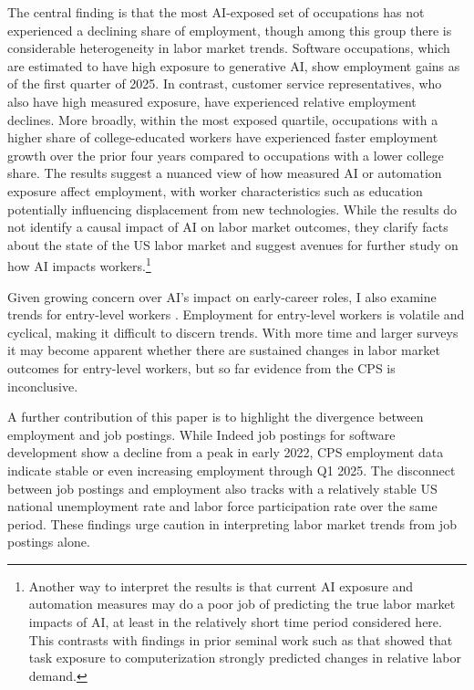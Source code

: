\documentclass[12pt]{article}
\numberwithin{equation}{section}
\theoremstyle{theorem}\newcustomtheorem{theorem}{{\bf\sc Theorem}}
\theoremstyle{definition}\newcustomtheorem{assumption}{{\bf\sc Assumption}}
\theoremstyle{theorem} \newcustomtheorem{proposition}{{\bf\sc Proposition}}
\begin{document}
The central finding is that the most AI-exposed set of occupations has not experienced a declining share of employment, though among this group there is considerable heterogeneity in labor market trends. Software occupations, which are estimated to have high exposure to generative AI, show employment gains as of the first quarter of 2025. In contrast, customer service representatives, who also have high measured exposure, have experienced relative employment declines. More broadly, within the most exposed quartile, occupations with a higher share of college-educated workers have experienced faster employment growth over the prior four years compared to occupations with a lower college share. The results suggest a nuanced view of how measured AI or automation exposure affect employment, with worker characteristics such as education potentially influencing displacement from new technologies. While the results do not identify a causal impact of AI on labor market outcomes, they clarify facts about the state of the US labor market and suggest avenues for further study on how AI impacts workers.\footnote{Another way to interpret the results is that current AI exposure and automation measures may do a poor job of predicting the true labor market impacts of AI, at least in the relatively short time period considered here. This contrasts with findings in prior seminal work such as \citet{autor_skill_2003} that showed that task exposure to computerization strongly predicted changes in relative labor demand.}

Given growing concern over AI's impact on early-career roles, I also examine trends for entry-level workers \citep{thompson_something_2025,raman_opinion_2025,allen_behind_2025}. Employment for entry-level workers is volatile and cyclical, making it difficult to discern trends. With more time and larger surveys it may become apparent whether there are sustained changes in labor market outcomes for entry-level workers, but so far evidence from the CPS is inconclusive. 

A further contribution of this paper is to highlight the divergence between employment and job postings. While Indeed job postings for software development show a decline from a peak in early 2022, CPS employment data indicate stable or even increasing employment through Q1 2025. The disconnect between job postings and employment also tracks with a relatively stable US national unemployment rate and labor force participation rate over the same period. These findings urge caution in interpreting labor market trends from job postings alone.
\end{document}
